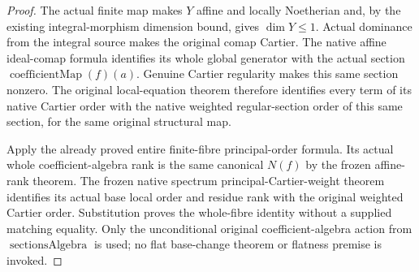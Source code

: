 \begin{proof}
The actual finite map makes $Y$ affine and locally Noetherian and,
by the existing integral-morphism dimension bound, gives $\dim Y\leq1$.
Actual dominance from the integral source makes the original comap
Cartier. The native affine ideal-comap formula identifies its whole
global generator with the actual section
$\operatorname{coefficientMap}(f)(a)$. Genuine Cartier regularity
makes this same section nonzero. The original local-equation theorem
therefore identifies every term of its native Cartier order with
the native weighted regular-section order of this same section, for
the same original structural map.

Apply the already proved entire finite-fibre principal-order formula.
Its actual whole coefficient-algebra rank is the same canonical
$N(f)$ by the frozen affine-rank theorem. The frozen native spectrum
principal-Cartier-weight theorem identifies its actual base local order
and residue rank with the original weighted Cartier order. Substitution
proves the whole-fibre identity without a supplied matching equality.
Only the unconditional original coefficient-algebra action from
$\operatorname{sectionsAlgebra}$ is used; no flat base-change theorem
or flatness premise is invoked.
\end{proof}

